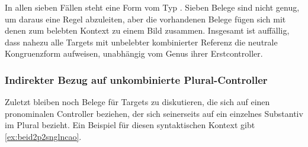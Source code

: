In allen sieben Fällen steht eine Form vom Typ . Sieben Belege
sind nicht genug, um daraus eine Regel abzuleiten, aber die vorhandenen Belege
fügen sich mit denen zum belebten Kontext zu einem Bild zusammen. Insgesamt ist
auffällig, dass nahezu alle Targets mit unbelebter kombinierter Referenz die
neutrale Kongruenzform  aufweisen, unabhängig vom Genus ihrer
Erstcontroller.

\subsubsection{Indirekter Bezug auf unkombinierte Plural-Controller}
\label{subsubsec:beid2p2snglncao}

Zuletzt bleiben noch Belege für Targets zu diskutieren, die sich auf einen
pronominalen Controller beziehen, der sich seinerseits auf ein einzelnes
Substantiv im Plural bezieht. Ein Beispiel für diesen syntaktischen Kontext
gibt \cref{ex:beid2p2snglncao}.

